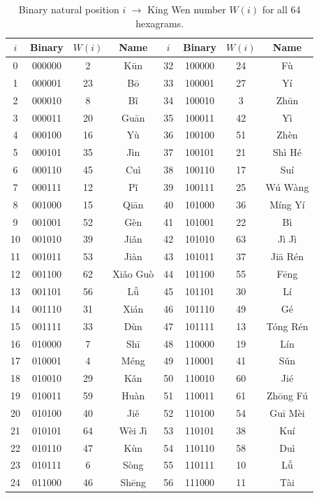 \documentclass[11pt,a4paper]{article}
\begin{document}
\begin{table}[ht]
\centering
\caption{Binary natural position $i$ $\to$ King Wen number $W(i)$ for all 64 hexagrams.}
\label{tab:mapping}
\small
\begin{tabular}{@{}cccc|cccc@{}}
\toprule
$i$ & Binary & $W(i)$ & Name & $i$ & Binary & $W(i)$ & Name \\
\midrule
0 & 000000 & 2 & Kūn & 32 & 100000 & 24 & Fù \\
1 & 000001 & 23 & Bō & 33 & 100001 & 27 & Yí \\
2 & 000010 & 8 & Bǐ & 34 & 100010 & 3 & Zhūn \\
3 & 000011 & 20 & Guān & 35 & 100011 & 42 & Yì \\
4 & 000100 & 16 & Yù & 36 & 100100 & 51 & Zhèn \\
5 & 000101 & 35 & Jìn & 37 & 100101 & 21 & Shì Hé \\
6 & 000110 & 45 & Cuì & 38 & 100110 & 17 & Suí \\
7 & 000111 & 12 & Pǐ & 39 & 100111 & 25 & Wú Wàng \\
8 & 001000 & 15 & Qiān & 40 & 101000 & 36 & Míng Yí \\
9 & 001001 & 52 & Gèn & 41 & 101001 & 22 & Bì \\
10 & 001010 & 39 & Jiǎn & 42 & 101010 & 63 & Jì Jì \\
11 & 001011 & 53 & Jiàn & 43 & 101011 & 37 & Jiā Rén \\
12 & 001100 & 62 & Xiǎo Guò & 44 & 101100 & 55 & Fēng \\
13 & 001101 & 56 & Lǚ & 45 & 101101 & 30 & Lí \\
14 & 001110 & 31 & Xián & 46 & 101110 & 49 & Gé \\
15 & 001111 & 33 & Dùn & 47 & 101111 & 13 & Tóng Rén \\
16 & 010000 & 7 & Shī & 48 & 110000 & 19 & Lín \\
17 & 010001 & 4 & Méng & 49 & 110001 & 41 & Sǔn \\
18 & 010010 & 29 & Kǎn & 50 & 110010 & 60 & Jié \\
19 & 010011 & 59 & Huàn & 51 & 110011 & 61 & Zhōng Fú \\
20 & 010100 & 40 & Jiě & 52 & 110100 & 54 & Guī Mèi \\
21 & 010101 & 64 & Wèi Jì & 53 & 110101 & 38 & Kuí \\
22 & 010110 & 47 & Kùn & 54 & 110110 & 58 & Duì \\
23 & 010111 & 6 & Sòng & 55 & 110111 & 10 & Lǚ \\
24 & 011000 & 46 & Shēng & 56 & 111000 & 11 & Tài \\

\end{tabular}
\end{table}
\end{document}
